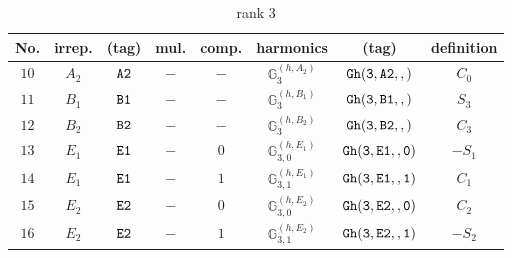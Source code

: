 \documentclass[fleqn,8pt]{jsarticle}
\begin{document}
\begin{table}[ht!]
\begin{center}
\caption{rank 3}
\renewcommand{\arraystretch}{1.3}
\begin{tabular}{cccccccc} \hline \hline
No. & irrep. & (tag) & mul. & comp. & harmonics & (tag) & definition \\ \hline
$ 10 $ & $ A_{2} $ & $ {\tt A2} $ & $ - $ & $ - $ & $ \mathbb{G}_{3}^{(h,A_{2})} $ & $ {\tt Gh(3,A2,,)} $ & $ C_{0} $ \\
$ 11 $ & $ B_{1} $ & $ {\tt B1} $ & $ - $ & $ - $ & $ \mathbb{G}_{3}^{(h,B_{1})} $ & $ {\tt Gh(3,B1,,)} $ & $ S_{3} $ \\
$ 12 $ & $ B_{2} $ & $ {\tt B2} $ & $ - $ & $ - $ & $ \mathbb{G}_{3}^{(h,B_{2})} $ & $ {\tt Gh(3,B2,,)} $ & $ C_{3} $ \\
$ 13 $ & $ E_{1} $ & $ {\tt E1} $ & $ - $ & $ 0 $ & $ \mathbb{G}_{3,0}^{(h,E_{1})} $ & $ {\tt Gh(3,E1,,0)} $ & $ - S_{1} $ \\
$ 14 $ & $ E_{1} $ & $ {\tt E1} $ & $ - $ & $ 1 $ & $ \mathbb{G}_{3,1}^{(h,E_{1})} $ & $ {\tt Gh(3,E1,,1)} $ & $ C_{1} $ \\
$ 15 $ & $ E_{2} $ & $ {\tt E2} $ & $ - $ & $ 0 $ & $ \mathbb{G}_{3,0}^{(h,E_{2})} $ & $ {\tt Gh(3,E2,,0)} $ & $ C_{2} $ \\
$ 16 $ & $ E_{2} $ & $ {\tt E2} $ & $ - $ & $ 1 $ & $ \mathbb{G}_{3,1}^{(h,E_{2})} $ & $ {\tt Gh(3,E2,,1)} $ & $ - S_{2} $ \\
 \hline \hline
\end{tabular}
\end{center}
\end{table}
\end{document}
